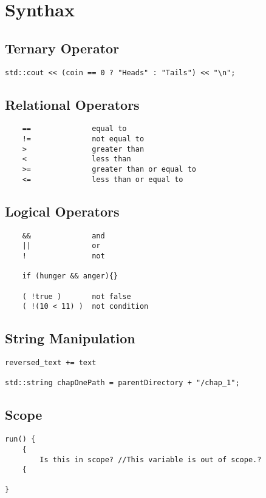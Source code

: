 \documentclass[openany]{report}
\begin{document}
\section{Synthax}
\subsection{Ternary Operator}
\begin{verbatim}
std::cout << (coin == 0 ? "Heads" : "Tails") << "\n";
\end{verbatim}

\subsection{Relational Operators}

\begin{verbatim}
    ==              equal to
    !=              not equal to
    >               greater than
    <               less than
    >=              greater than or equal to
    <=              less than or equal to
\end{verbatim}

\subsection{Logical Operators}

\begin{verbatim}
    &&              and 
    ||              or
    !               not

    if (hunger && anger){}

    ( !true )       not false
    ( !(10 < 11) )  not condition 
\end{verbatim}

\subsection{String Manipulation}

\begin{verbatim}
reversed_text += text

std::string chapOnePath = parentDirectory + "/chap_1";
\end{verbatim}

\subsection{Scope}

\begin{verbatim}
run() {
    {
        Is this in scope? //This variable is out of scope.?
    {
    
}
\end{verbatim}
\end{document}

